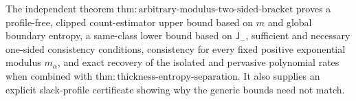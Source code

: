 The independent theorem \(\mathrm{thm:arbitrary\text{-}modulus\text{-}two\text{-}sided\text{-}bracket}\) proves a profile-free, clipped count-estimator upper bound based on \(m\) and global boundary entropy, a same-class lower bound based on \(\mathsf J_{-}\), sufficient and necessary one-sided consistency conditions, consistency for every fixed positive exponential modulus \(m_\alpha\), and exact recovery of the isolated and pervasive polynomial rates when combined with \(\mathrm{thm:thickness\text{-}entropy\text{-}separation}\). It also supplies an explicit slack-profile certificate showing why the generic bounds need not match.